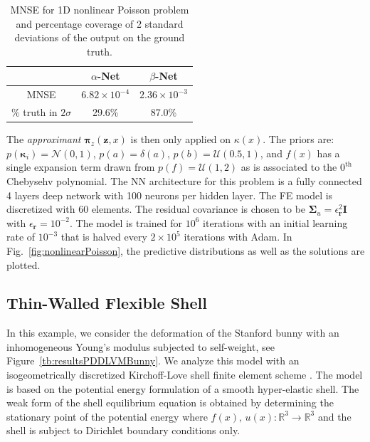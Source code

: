 \documentclass[11pt, fleqn]{article}
\def\bfSigma{{\mathbf \Sigma}}
\def\Ibf{{\mathbf I}}
\def\z{{\mathbf z}}
\def\kappabf{{\boldsymbol{\kappa}}}
\def\r{{\mathbf r}}
\def\bR{{\mathbb R}}
\def\NPDF{{\mathcal N}}
\def\bpi{{\boldsymbol \pi}}
\def\bpi{{\boldsymbol \pi}}
\begin{document}
\begin{table}
\centering
\centering
\begin{tabular}{ c c c }
    \centering
              & $\alpha$-Net & $\beta$-Net \\ 
    \hline
    MNSE     & $6.82\times10^{-4}$ & $2.36\times10^{-3}$ \\   
    \hline
    \% truth in $2\sigma$  & 29.6\% & 87.0\%  \\
    \hline
\end{tabular}
\caption{MNSE for 1D nonlinear Poisson problem and percentage coverage of 2 standard deviations of the output on the ground truth.\\}
\end{table}
 The \textit{approximant} $\bpi_z(\z, x)$ is then only applied on $\kappa(x)$. The priors are: $p(\kappabf_i) = \NPDF(0, 1)$, $p(a) = {\delta}(a)$, $p(b) = \mathcal{U}(0.5, 1)$, and $f(x)$ has a single expansion term drawn from $p(f) = \mathcal{U}(1, 2)$ as is associated to the $0^\text{th}$
Chebysehv polynomial. The NN architecture for this problem is a fully connected 4 layers deep network with 100 neurons per hidden layer. The FE model is discretized with 60 elements. The residual covariance is chosen to be $\bfSigma_{u}=\epsilon_{\r}^2\Ibf$ with $\epsilon_{\r} = 10^{-2}$. The model is trained for $10^6$ iterations with an initial learning rate of $10^{-3}$ that is halved every $2\times 10^5$ iterations with Adam. In Fig.~\ref{fig:nonlinearPoisson}, the predictive distributions as well as the solutions are plotted.

\subsection{Thin-Walled Flexible Shell}\label{sec:3DshellObject}
%
In this example, we consider the deformation of the Stanford bunny with an inhomogeneous Young's modulus subjected to self-weight, see Figure~\ref{tb:resultsPDDLVMBunny}.
%
We analyze this model with an isogeometrically discretized Kirchoff-Love shell finite element scheme \cite{cirak2000subdivision, cirak2011subdivision, febrianto2022digital}. The model is based on the potential energy formulation of a smooth hyper-elastic shell. The weak form of the shell equilibrium equation is obtained by determining the stationary point of the potential energy where $f(x),\, u(x):\bR^3\rightarrow\bR^3$ and the shell is subject to Dirichlet boundary conditions only.
\end{document}

